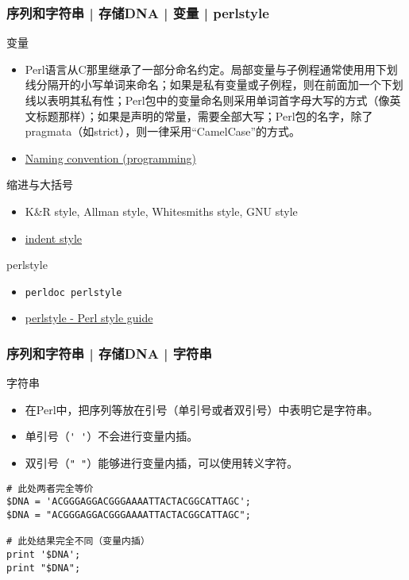 \begin{frame}[fragile]
  \frametitle{序列和字符串 | 存储DNA | 变量 | perlstyle}
  \begin{block}{变量}
    \begin{itemize}
      \item {\small 
Perl语言从C那里继承了一部分命名约定。局部变量与子例程通常使用用下划线分隔开的小写单词来命名；如果是私有变量或子例程，则在前面加一个下划线以表明其私有性；Perl包中的变量命名则采用单词首字母大写的方式（像英文标题那样）；如果是声明的常量，需要全部大写；Perl包的名字，除了pragmata（如strict），则一律采用“CamelCase”的方式。}
      \item \href{https://en.wikipedia.org/wiki/Naming\_convention\_(programming)}{Naming convention (programming)}
    \end{itemize}
  \end{block}
  \pause
  \vspace{-0.5em}
  \begin{block}{缩进与大括号}
    \begin{itemize}
      \item K\&R style, Allman style, Whitesmiths style, GNU style
      \item \href{http://catb.org/jargon/html/I/indent-style.html}{indent style}
    \end{itemize}
  \end{block}
  \pause
  \vspace{-0.5em}
  \begin{block}{perlstyle}
    \begin{itemize}
      \item \verb|perldoc perlstyle|
      \item \href{http://perldoc.perl.org/perlstyle.html}{perlstyle - Perl style guide}
    \end{itemize}
  \end{block}
\end{frame}

\begin{frame}[fragile]
  \frametitle{序列和字符串 | 存储DNA | \alert{字符串}}
  \begin{block}{字符串}
    \begin{itemize}
      \item 在Perl中，把序列等放在引号（单引号或者双引号）中表明它是字符串。
      \item 单引号（\verb|' '|）不会进行变量内插。
      \item 双引号（\verb|" "|）能够进行变量内插，可以使用转义字符。
    \end{itemize}
  \end{block}
  \pause
  \vspace{-1.5em}
\begin{lstlisting}
# 此处两者完全等价
$DNA = 'ACGGGAGGACGGGAAAATTACTACGGCATTAGC';
$DNA = "ACGGGAGGACGGGAAAATTACTACGGCATTAGC";

# 此处结果完全不同（变量内插）
print '$DNA';
print "$DNA";
\end{lstlisting}
\end{frame}

